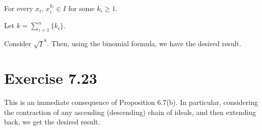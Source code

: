 \documentclass{article}
\theoremstyle{definition}
\begin{document}
For every $ x_{i} $, $ x_{i}^{k_{i}} \in I $ for some $ k_{i} \geq 1 $.

Let $ k = \sum_{i = 1}^{n}\{k_{i}\} $.

Consider $ \sqrt{I}^{k} $. Then, using the binomial formula, we have the desired result.

\section{Exercise 7.23}

This is an immediate consequence of Proposition 6.7(b).
In particular, considering the contraction of any ascending (descending)
chain of ideals, and then extending back, we get the desired result.
\end{document}
